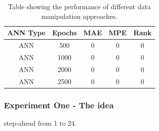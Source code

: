 \begin{table}[H]
\centering  %
\begin{tabular}{c c c c c} %
ANN Type & Epochs & MAE & MPE & Rank \\ [0.5ex] %
\hline                  %
ANN & 500 & 0 & 0 & 0 \\ %
ANN & 1000 & 0 & 0 & 0 \\
ANN & 2000 & 0 & 0 & 0 \\
ANN & 2500 & 0 & 0 & 0 \\ [1ex] %
\hline %
\end{tabular}
\caption{Table showing the performance of different data manipulation approaches.} %
\label{table:performanceOpti} %
\end{table} 

\subsubsection{Experiment One - The idea}
step-ahead from 1 to 24.

